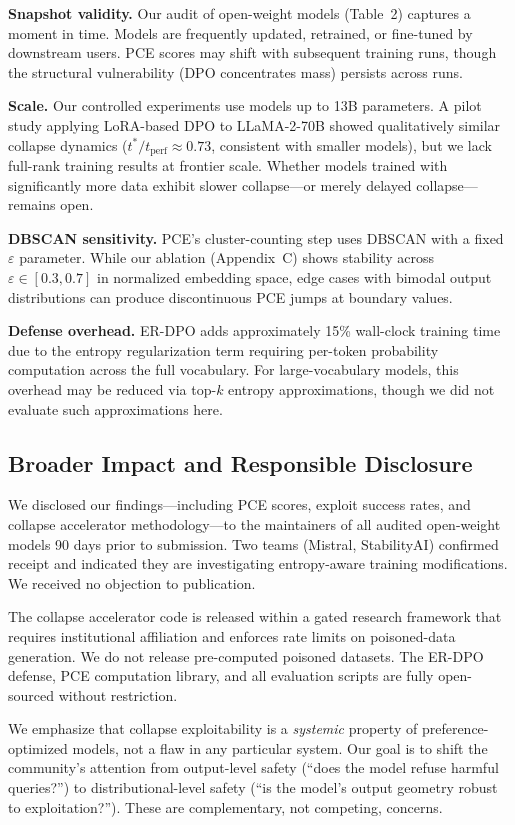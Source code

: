 \textbf{Snapshot validity.} Our audit of open-weight models (Table~2) captures a moment in time. Models are frequently updated, retrained, or fine-tuned by downstream users. PCE scores may shift with subsequent training runs, though the structural vulnerability (DPO concentrates mass) persists across runs.

\textbf{Scale.} Our controlled experiments use models up to 13B parameters. A pilot study applying LoRA-based DPO to LLaMA-2-70B showed qualitatively similar collapse dynamics ($t^* / t_{\text{perf}} \approx 0.73$, consistent with smaller models), but we lack full-rank training results at frontier scale. Whether models trained with significantly more data exhibit slower collapse---or merely delayed collapse---remains open.

\textbf{DBSCAN sensitivity.} PCE's cluster-counting step uses DBSCAN with a fixed $\varepsilon$ parameter. While our ablation (Appendix~C) shows stability across $\varepsilon \in [0.3, 0.7]$ in normalized embedding space, edge cases with bimodal output distributions can produce discontinuous PCE jumps at boundary values.

\textbf{Defense overhead.} ER-DPO adds approximately 15\% wall-clock training time due to the entropy regularization term requiring per-token probability computation across the full vocabulary. For large-vocabulary models, this overhead may be reduced via top-$k$ entropy approximations, though we did not evaluate such approximations here.

\subsection{Broader Impact and Responsible Disclosure}

We disclosed our findings---including PCE scores, exploit success rates, and collapse accelerator methodology---to the maintainers of all audited open-weight models 90 days prior to submission. Two teams (Mistral, StabilityAI) confirmed receipt and indicated they are investigating entropy-aware training modifications. We received no objection to publication.

The collapse accelerator code is released within a gated research framework that requires institutional affiliation and enforces rate limits on poisoned-data generation. We do not release pre-computed poisoned datasets. The ER-DPO defense, PCE computation library, and all evaluation scripts are fully open-sourced without restriction.

We emphasize that collapse exploitability is a \emph{systemic} property of preference-optimized models, not a flaw in any particular system. Our goal is to shift the community's attention from output-level safety (``does the model refuse harmful queries?'') to distributional-level safety (``is the model's output geometry robust to exploitation?''). These are complementary, not competing, concerns.

